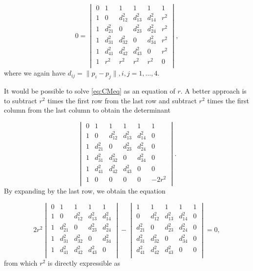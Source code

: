 \begin{equation}\label{eq:CMeq}
0 = 
\begin{vmatrix}
0 & 1 & 1 & 1 & 1 & 1 \\
1 & 0 & d^2_{12} & d^2_{13} & d^2_{14} & r^2 \\
1 & d^2_{21} & 0 & d^2_{23} & d^2_{24} & r^2 \\
1 & d^2_{31} & d^2_{32} & 0 & d^2_{34} & r^2 \\ 
1 & d^2_{41} & d^2_{42} & d^2_{43} & 0 & r^2 \\
1 & r^2 & r^2 & r^2 & r^2 & 0 \\
\end{vmatrix}, 
\end{equation}
where we again have   $d_{ij} = \|p_i - p_j\|, i,j=1,\dots,4$.\newline  

It would be possible to solve \ref{eq:CMeq} as an equation of $r$. A better approach is to  subtract $r^2$ times the first row from the last row and subtract $r^2$ times the first column from the last column to obtain the determinant 



$$
\begin{vmatrix}
0 & 1 & 1 & 1 & 1 & 1 \\
1 & 0 & d^2_{12} & d^2_{13} & d^2_{14} & 0 \\
1 & d^2_{21} & 0 & d^2_{23} & d^2_{24} & 0 \\
1 & d^2_{31} & d^2_{32} & 0 & d^2_{34} & 0 \\ 
1 & d^2_{41} & d^2_{42} & d^2_{43} & 0 & 0 \\
1 & 0 & 0 & 0 & 0 & -2r^2 \\
\end{vmatrix}. 
$$
By expanding by the last row, we obtain the equation

$$
2r^2 \begin{vmatrix}
0 & 1 & 1 & 1 & 1 \\
1 & 0 & d^2_{12} & d^2_{13} & d^2_{14} \\
1 & d^2_{21} & 0 & d^2_{23} & d^2_{24} \\
1 & d^2_{31} & d^2_{32} & 0 & d^2_{34} \\ 
1 & d^2_{41} & d^2_{42} & d^2_{43} & 0 \\
\end{vmatrix} 
-
\begin{vmatrix}
1 & 1 & 1 & 1 & 1 \\
0 & d^2_{12} & d^2_{13} & d^2_{14} & 0 \\
d^2_{21} & 0 & d^2_{23} & d^2_{24} & 0 \\
d^2_{31} & d^2_{32} & 0 & d^2_{34} & 0 \\ 
d^2_{41} & d^2_{42} & d^2_{43} & 0 & 0 \\
\end{vmatrix} = 0,
$$
from which $r^2$ is directly expressible as

